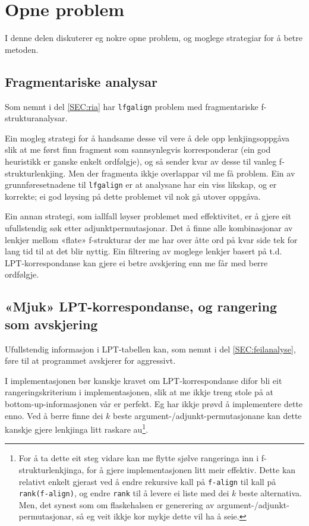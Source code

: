 \documentclass[11pt,a4paper,oneside,draft]{report}
\begin{document}
\section{Opne problem}
\label{sec-5.4}

   \label{SEC:opneproblem}

I denne delen diskuterer eg nokre opne problem, og moglege strategiar
for å betre metoden.

\subsection{Fragmentariske analysar}
\label{sec-5.4.1}

Som nemnt i del \ref{SEC:ria} har \texttt{lfgalign} problem med
fragmentariske f-strukturanalysar. 


Ein mogleg strategi for å handsame desse vil vere å dele opp
lenkjingsoppgåva slik at me først finn fragment som sannsynlegvis
korresponderar (ein god heuristikk er ganske enkelt ordfølgje), og så
sender kvar av desse til vanleg f-strukturlenkjing. Men der fragmenta
ikkje overlappar vil me få problem. Ein av grunnføresetnadene til
\texttt{lfgalign} er at analysane har ein viss likskap, og er korrekte; ei
god løysing på dette problemet vil nok gå utover oppgåva.

Ein annan strategi, som iallfall løyser problemet med effektivitet, er
å gjere eit ufullstendig søk etter adjunktpermutasjonar. Det å finne
alle kombinasjonar av lenkjer mellom «flate» f-strukturar der me har
over åtte ord på kvar side tek for lang tid til at det blir
nyttig. Ein filtrering av moglege lenkjer basert på
t.d. LPT-korrespondanse kan gjere ei betre avskjering enn me får med
berre ordfølgje.

\subsection{«Mjuk» LPT-korrespondanse, og rangering som avskjering}
\label{sec-5.4.2}

Ufullstendig informasjon i LPT-tabellen kan, som nemnt i del
\ref{SEC:feilanalyse}, føre til at programmet avskjerer for
aggressivt.

I implementasjonen bør kanskje kravet om LPT-korrespondanse difor bli
eit rangeringskriterium i implementasjonen, slik at me ikkje treng
stole på at bottom-up-informasjonen vår er perfekt. Eg har ikkje prøvd
å implementere dette enno. Ved å berre finne dei $k$ beste
argument-/adjunkt-permutasjonane kan dette kanskje gjere lenkjinga
litt raskare au\footnote{For å ta dette eit steg vidare kan me flytte sjølve rangeringa
        inn i f-strukturlenkjinga, for å gjere implementasjonen litt
        meir effektiv. Dette kan relativt enkelt gjerast ved å endre
        rekursive kall på \texttt{f-align} til kall på \texttt{rank(f-align)}, og
        endre \texttt{rank} til å levere ei liste med dei $k$ beste
        alternativa. Men, det synest som om flaskehalsen er generering
        av argument-/adjunkt-permutasjonar, så eg veit ikkje kor mykje
        dette vil ha å seie. }.
\end{document}
